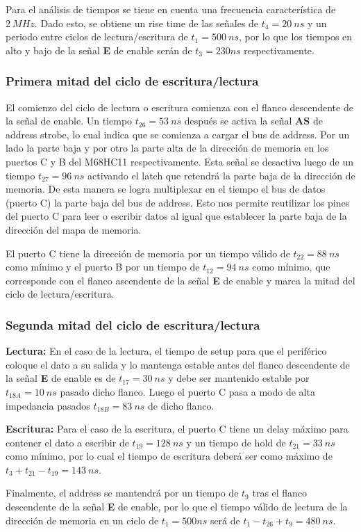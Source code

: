 Para el análisis de tiempos se tiene en cuenta una frecuencia característica de $2 \ MHz$. Dado esto, se obtiene un rise time de las señales de $t_4 = 20 \ ns$ y un periodo entre ciclos de lectura/escritura de $t_1 = 500 \ ns$, por lo que los tiempos en alto y bajo de la señal \textbf{E} de enable serán de $t_3 = 230 ns$ respectivamente. 

\subsubsection{Primera mitad del ciclo de escritura/lectura}

El comienzo del ciclo de lectura o escritura comienza con el flanco descendente de la señal de enable. Un tiempo $t_{26} = 53 \ ns$ después se activa la señal \textbf{AS} de address strobe, lo cual indica que se comienza a cargar el bus de address. Por un lado la parte baja y por otro la parte alta de la dirección de memoria en los puertos C y B del M68HC11 respectivamente. Esta señal se desactiva luego de un tiempo $t_{27} = 96 \ ns$ activando el latch que retendrá la parte baja de la dirección de memoria. De esta manera se logra multiplexar en el tiempo el bus de datos (puerto C) la parte baja del bus de address. Esto nos permite reutilizar los pines del puerto C para leer o escribir datos al igual que establecer la parte baja de la dirección del mapa de memoria.

El puerto C tiene la dirección de memoria por un tiempo válido de $t_{22} = 88 \ ns$ como mínimo y el puerto B por un tiempo de $t_{12} = 94 \ ns$ como mínimo, que corresponde con el flanco ascendente de la señal \textbf{E} de enable y marca la mitad del ciclo de lectura/escritura.

\subsubsection{Segunda mitad del ciclo de escritura/lectura} 
\textbf{Lectura:}
En el caso de la lectura, el tiempo de setup para que el periférico coloque el dato a su salida y lo mantenga estable antes del flanco descendente de la señal \textbf{E} de enable es de $t_{17} = 30 \ ns$ y debe ser mantenido estable por $t_{18A} = 10 \ ns$ pasado dicho flanco. Luego el puerto C pasa a modo de alta impedancia pasados $t_{18B} = 83 \ ns$ de dicho flanco.

\textbf{Escritura:}
Para el caso de la escritura, el puerto C tiene un delay máximo para contener el dato a escribir de $t_{19} = 128 \ ns$ y un tiempo de hold de $t_{21} = 33 \ ns$ como mínimo, por lo cual el tiempo de escritura deberá ser como máximo de $t_{3} + t_{21} - t_{19} = 143 \ ns$.

Finalmente, el address se mantendrá por un tiempo de $t_9$ tras el flanco descendente de la señal \textbf{E} de enable, por lo que el tiempo válido de lectura de la dirección de memoria en un ciclo de $t_1 = 500ns$ será de $t_1 - t_{26} + t_{9} = 480 \ ns$.